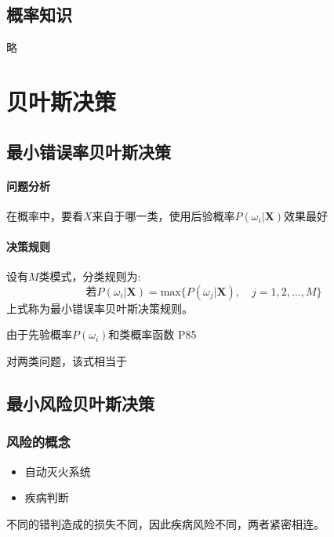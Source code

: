 \documentclass[11pt]{book}
\begin{document}
\subsection{概率知识}

略

\section{贝叶斯决策}


\subsection{最小错误率贝叶斯决策}

\paragraph{问题分析}%
\label{par:wen_ti_fen_xi_}

在概率中，要看$X$来自于哪一类，使用后验概率$P(\omega_i | \boldsymbol{X})$效果最好

\paragraph{决策规则}%
\label{par:jue_ce_gui_ze_}

设有$M$类模式，分类规则为: 
\begin{equation}
	\mbox{若}P(\omega_i | \boldsymbol{X}) = \text{max}\{P(\omega_j | \boldsymbol{X}), \quad j = 1, 2, \ldots, M\}
\end{equation}
上式称为最小错误率贝叶斯决策规则。

由于先验概率$P(\omega_i)$和类概率函数 P85

对两类问题，该式相当于

\subsection{最小风险贝叶斯决策}

\subsubsection{风险的概念}%
\label{ssub:feng_xian_de_gai_nian_}

\begin{itemize}
	\item 自动灭火系统
	\item 疾病判断
\end{itemize}

不同的错判造成的损失不同，因此疾病风险不同，两者紧密相连。
\end{document}
